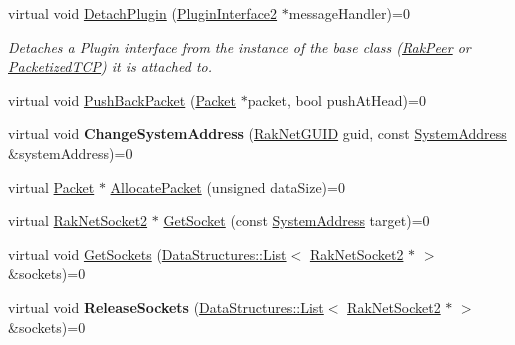 \begin{DoxyCompactItemize}
virtual void \hyperlink{class_rak_net_1_1_rak_peer_interface_a4960f6a8d37d70e7e98f1f6fe54e323d}{Detach\-Plugin} (\hyperlink{class_rak_net_1_1_plugin_interface2}{Plugin\-Interface2} $\ast$message\-Handler)=0
\begin{DoxyCompactList}\small\item\em Detaches a Plugin interface from the instance of the base class (\hyperlink{class_rak_net_1_1_rak_peer}{Rak\-Peer} or \hyperlink{class_rak_net_1_1_packetized_t_c_p}{Packetized\-T\-C\-P}) it is attached to. \end{DoxyCompactList}\item 
virtual void \hyperlink{class_rak_net_1_1_rak_peer_interface_a29c5527b07a3ddc32083d8ec1e24318b}{Push\-Back\-Packet} (\hyperlink{struct_rak_net_1_1_packet}{Packet} $\ast$packet, bool push\-At\-Head)=0
\item 
\hypertarget{class_rak_net_1_1_rak_peer_interface_a404a137e0d369d98f119b363c6b21672}{virtual void {\bfseries Change\-System\-Address} (\hyperlink{struct_rak_net_1_1_rak_net_g_u_i_d}{Rak\-Net\-G\-U\-I\-D} guid, const \hyperlink{struct_rak_net_1_1_system_address}{System\-Address} \&system\-Address)=0}\label{class_rak_net_1_1_rak_peer_interface_a404a137e0d369d98f119b363c6b21672}

\item 
virtual \hyperlink{struct_rak_net_1_1_packet}{Packet} $\ast$ \hyperlink{class_rak_net_1_1_rak_peer_interface_a3e38bdd227138f640a942102813ce779}{Allocate\-Packet} (unsigned data\-Size)=0
\item 
virtual \hyperlink{class_rak_net_1_1_rak_net_socket2}{Rak\-Net\-Socket2} $\ast$ \hyperlink{class_rak_net_1_1_rak_peer_interface_adae8cd6baaa718eb5a818f5271a58122}{Get\-Socket} (const \hyperlink{struct_rak_net_1_1_system_address}{System\-Address} target)=0
\item 
virtual void \hyperlink{class_rak_net_1_1_rak_peer_interface_a09ef1181af600ec2c255a295154fe367}{Get\-Sockets} (\hyperlink{class_data_structures_1_1_list}{Data\-Structures\-::\-List}$<$ \hyperlink{class_rak_net_1_1_rak_net_socket2}{Rak\-Net\-Socket2} $\ast$ $>$ \&sockets)=0
\item 
\hypertarget{class_rak_net_1_1_rak_peer_interface_aa411559fbade7181e7475a14684a1b3f}{virtual void {\bfseries Release\-Sockets} (\hyperlink{class_data_structures_1_1_list}{Data\-Structures\-::\-List}$<$ \hyperlink{class_rak_net_1_1_rak_net_socket2}{Rak\-Net\-Socket2} $\ast$ $>$ \&sockets)=0}\label{class_rak_net_1_1_rak_peer_interface_aa411559fbade7181e7475a14684a1b3f}


\end{DoxyCompactItemize}
